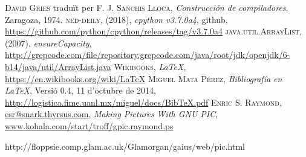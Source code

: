 
\begin{thebibliography}{X}
    \textsc{David Gries}
    traduït per \textsc{F. J. Sanchis Lloca},
    \textit{Construcción de compiladores},
    Zaragoza, 1974.
    \textsc{ned-deily},
    (2018),
    \textit{cpython v3.7.0a4}, github,
    \url{https://github.com/python/cpython/releases/tag/v3.7.0a4}
    \textsc{java.util.ArrayList},
    (2007),
    \textit{ensureCapacity},
    \url{http://grepcode.com/file/repository.grepcode.com/java/root/jdk/openjdk/6-b14/java/util/ArrayList.java}
    \textsc{Wikibooks},
    \textit{\LaTeX},
    \url{https://en.wikibooks.org/wiki/LaTeX}
    \textsc{Miguel Mata Pérez},
    \textit{Bibliografía en \LaTeX},
    Versió 0.4, 11 d'octubre de 2014,
    \url{http://logistica.fime.uanl.mx/miguel/docs/BibTeX.pdf}
    \textsc{Enric S. Raymond},
    \href{mailto:esr@snark.thyrsus.com}{esr@snark.thyrsus.com},
    \textit{Making Pictures With GNU PIC},
    \url{www.kohala.com/start/troff/gpic.raymond.ps}
\end{thebibliography}

http://floppsie.comp.glam.ac.uk/Glamorgan/gaius/web/pic.html

